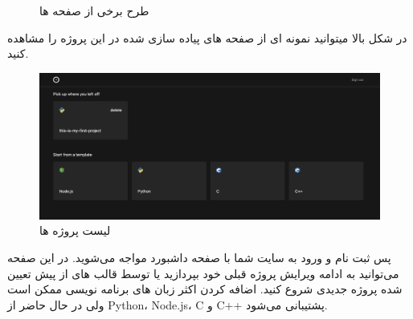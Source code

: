 \begin{figure}[htbp]
    \caption{طرح برخی از صفحه ها}
\end{figure}

در شکل بالا میتوانید نمونه ای از صفحه های پیاده سازی شده در این پروژه را مشاهده کنید.


\begin{figure}[h]
    \centering
    \includegraphics[width=1\textwidth]{./3-Design/projects.png}
    \caption{لیست پروژه ها}
    \label{fig:projects}
\end{figure}

پس ثبت نام و ورود به سایت شما با صفحه داشبورد مواجه می‌شوید. در این صفحه می‌توانید به ادامه ویرایش پروژه قبلی خود بپردازید یا توسط قالب های از پیش تعیین شده پروژه جدیدی شروع کنید.
اضافه کردن اکثر زبان های برنامه نویسی ممکن است ولی در حال حاضر از Python، Node.js، C و C++ پشتیبانی می‌شود.
